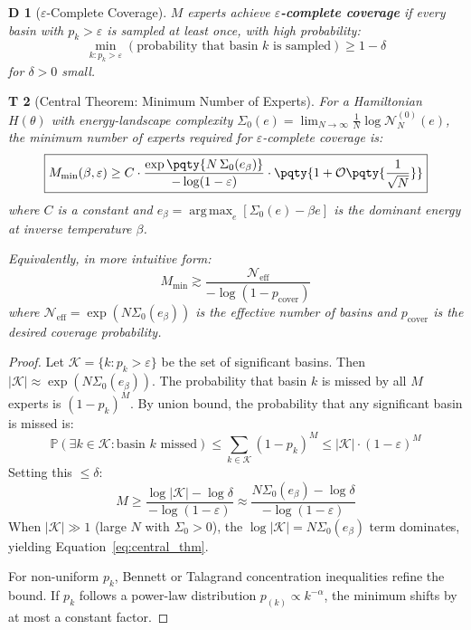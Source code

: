 \documentclass[12pt,a4paper]{article}
\newtheorem{theorem}Theorem[section]
\newtheorem{definition}[theorem]Definition
\newcommand{\Pbb}{\mathbb{P}}
\DeclareMathOperator*{\argmax}{arg\,max}
\begin{document}
\begin{definition}[\(\varepsilon\)-Complete Coverage]
\(M\) experts achieve \textbf{\(\varepsilon\)-complete coverage} if every basin with \(p_k > \varepsilon\) is sampled at least once, with high probability:
\begin{equation}
\min_{k : p_k > \varepsilon} (\text{probability that basin } k \text{ is sampled}) \geq 1 - \delta
\end{equation}
for \(\delta > 0\) small.
\end{definition}

\begin{theorem}[Central Theorem: Minimum Number of Experts]\label{thm:central}
For a Hamiltonian \(H(\theta)\) with energy-landscape complexity \(\Sigma_0(e) = \lim_{N\to\infty} \frac{1}{N} \log \mathcal{N}_N^{(0)}(e)\), the minimum number of experts required for \(\varepsilon\)-complete coverage is:
\begin{equation}\label{eq:central_thm}
\boxed{M_{\min}(\beta, \varepsilon) \geq C \cdot \frac{\exp\pqty{N \, \Sigma_0(e_\beta)}}{-\log(1 - \varepsilon)} \cdot \pqty{1 + \mathcal{O}\pqty{\frac{1}{\sqrt{N}}}}}
\end{equation}
where \(C\) is a constant and \(e_\beta = \argmax_e [\Sigma_0(e) - \beta e]\) is the dominant energy at inverse temperature \(\beta\).

Equivalently, in more intuitive form:
\begin{equation}\label{eq:central_simple}
\boxed{M_{\min} \gtrsim \frac{\mathcal{N}_{\text{eff}}}{-\log(1 - p_{\text{cover}})}}
\end{equation}
where \(\mathcal{N}_{\text{eff}} = \exp(N \Sigma_0(e_\beta))\) is the effective number of basins and \(p_{\text{cover}}\) is the desired coverage probability.
\end{theorem}

\begin{proof}
Let \(\mathcal{K} = \{k : p_k > \varepsilon\}\) be the set of significant basins. Then \(|\mathcal{K}| \approx \exp(N \Sigma_0(e_\beta))\). The probability that basin \(k\) is missed by all \(M\) experts is \((1-p_k)^M\). By union bound, the probability that any significant basin is missed is:
\begin{equation}
\Pbb(\exists k \in \mathcal{K} : \text{basin } k \text{ missed}) \leq \sum_{k \in \mathcal{K}} (1-p_k)^M \leq |\mathcal{K}| \cdot (1 - \varepsilon)^M
\end{equation}
Setting this \(\leq \delta\):
\begin{equation}
M \geq \frac{\log |\mathcal{K}| - \log \delta}{-\log(1-\varepsilon)} \approx \frac{N \Sigma_0(e_\beta) - \log \delta}{-\log(1-\varepsilon)}
\end{equation}
When \(|\mathcal{K}| \gg 1\) (large \(N\) with \(\Sigma_0 > 0\)), the \(\log |\mathcal{K}| = N \Sigma_0(e_\beta)\) term dominates, yielding Equation~\eqref{eq:central_thm}.

For non-uniform \(p_k\), Bennett or Talagrand concentration inequalities refine the bound. If \(p_k\) follows a power-law distribution \(p_{(k)} \propto k^{-\alpha}\), the minimum shifts by at most a constant factor.
\end{proof}
\end{document}
